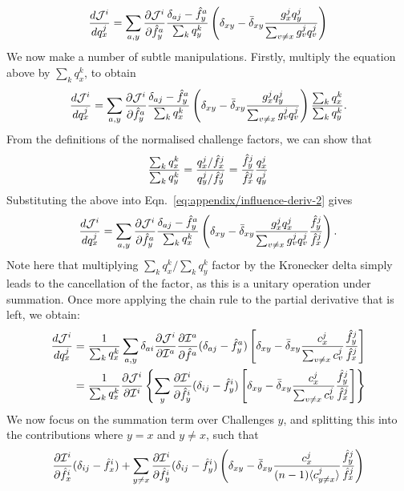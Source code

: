 \begin{equation}
    \frac{d \mathcal{J}^i}{d q_x^j} = \sum_{a,y} \frac{\partial \mathcal{J}^i}{\partial \hat{f}^a_y} \frac{\delta_{aj} - \hat{f}^a_y}{\sum_k q^k_y} \left(\delta_{xy} - \bar{\delta}_{xy} \frac{g^j_x q^j_y}{\sum_{v\neq x} g^j_v q^j_v}\right)
\end{equation}
We now make a number of subtle manipulations.
Firstly, multiply the equation above by $\sum_k q^k_x$, to obtain
\begin{equation}
    \frac{d \mathcal{J}^i}{d q_x^j} = \sum_{a,y} \frac{\partial \mathcal{J}^i}{\partial \hat{f}^a_y} \frac{\delta_{aj} - \hat{f}^a_y}{\sum_k q^k_x} \left(\delta_{xy} - \bar{\delta}_{xy} \frac{g^j_x q^j_y}{\sum_{v\neq x} g^j_v q^j_v}\right) \frac{\sum_k q^k_x}{\sum_k q^k_y}. 
    \label{eq:appendix/influence-deriv-2}
\end{equation}
From the definitions of the normalised challenge factors, we can show that 
\begin{equation}
    \frac{\sum_k q^k_x}{\sum_k q^k_y} = \frac{q^j_x/\hat{f}^j_x}{q^j_y/\hat{f}^j_y} = \frac{\hat{f}^j_y}{\hat{f}^j_x} \frac{q^j_x}{q^j_y}
\end{equation}
Substituting the above into Eqn.~\ref{eq:appendix/influence-deriv-2} gives 
\begin{equation}
    \frac{d \mathcal{J}^i}{d q_x^j} = \sum_{a,y} \frac{\partial \mathcal{J}^i}{\partial \hat{f}^a_y} \frac{\delta_{aj} - \hat{f}^a_y}{\sum_k q^k_x} \left(\delta_{xy} - \bar{\delta}_{xy} \frac{g^j_x q^j_x}{\sum_{v\neq x} g^j_v q^j_v} \frac{\hat{f}^j_y}{\hat{f}^j_x}\right).  
\end{equation}
Note here that multiplying $\sum_k q^k_x / \sum_k q^k_y$ factor by the Kronecker delta simply leads to the cancellation of the factor, as this is a unitary operation under summation. 
Once more applying the chain rule to the partial derivative that is left, we obtain:
\begin{align}
	\nonumber \frac{d \mathcal{J}^i}{d q^j_x} &= \frac{1}{\sum_k q^k_x} \sum_{a,y} \delta_{ai} \frac{\partial \mathcal{J}^i}{\partial \mathcal{I}^a}\frac{\partial \mathcal{I}^a}{\partial \hat{f}^a}(\delta_{aj} - \hat{f}^a_y)\left[\delta_{xy} - \bar{\delta}_{xy} \frac{c^j_x}{\sum_{v\neq x}c^j_v} \frac{\hat{f}^j_y}{\hat{f}^j_x} \right]\\
							   &= \frac{1}{\sum_k q^k_x} \frac{\partial \mathcal{J}^i}{\partial \mathcal{I}^i}\left\lbrace  \sum_{y} \frac{\partial \mathcal{I}^i}{\partial \hat{f}^i_y}(\delta_{ij} - \hat{f}^i_y)\left[\delta_{xy} - \bar{\delta}_{xy} \frac{c^j_x}{\sum_{v\neq x}c^j_v} \frac{\hat{f}^j_y}{\hat{f}^j_x}\right] \right\rbrace
\end{align}
We now focus on the summation term over Challenges $y$, and splitting this into the contributions where $y=x$ and $y \neq x$, such that 
\begin{equation}
	\frac{\partial \mathcal{I}^i}{\partial \hat{f}^i_x}(\delta_{ij} - \hat{f}^i_x) + \sum_{y \neq x} \frac{\partial \mathcal{I}^i}{\partial \hat{f}^i_y}(\delta_{ij} - \hat{f}^i_y)\left( \delta_{xy} - \bar{\delta}_{xy} \frac{c^j_x}{(n-1)\langle c^j_{y\neq x}\rangle} \frac{\hat{f}^j_y}{\hat{f}^j_x} \right)
\end{equation}
